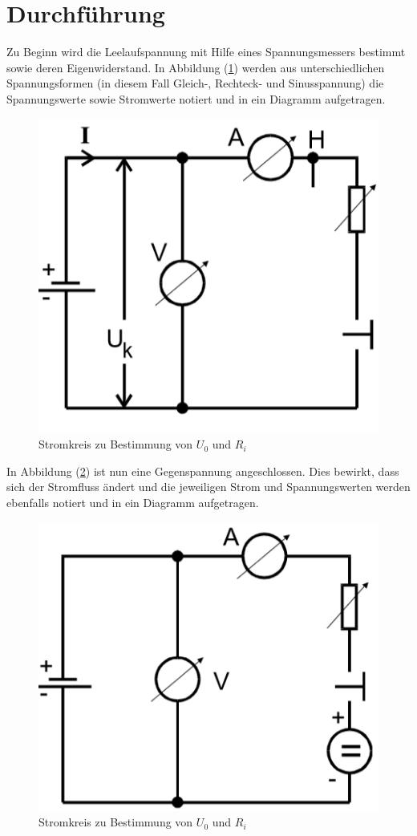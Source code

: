 \section{Durchführung}
Zu Beginn wird die Leelaufspannung mit Hilfe eines Spannungsmessers bestimmt sowie deren Eigenwiderstand.
In Abbildung (\ref{abb:2}) werden aus unterschiedlichen Spannungsformen (in diesem Fall Gleich-, Rechteck- und Sinusspannung)
die Spannungswerte sowie Stromwerte notiert und in ein Diagramm aufgetragen.
\begin{figure}[H]
  \centering
  \includegraphics[width= 10 cm , height=7 cm]{Bild2.png}
  \caption{Stromkreis zu Bestimmung von $U_0$ und $R_i$ \cite{1}}
  \label{abb:2}
\end{figure}
In Abbildung (\ref{abb:3}) ist nun eine Gegenspannung angeschlossen. Dies bewirkt, dass sich der Stromfluss
ändert und die jeweiligen Strom und Spannungswerten werden ebenfalls notiert und in ein Diagramm aufgetragen.
\begin{figure}[H]
  \centering
  \includegraphics[width=10 cm, height= 7 cm]{Bild3.png}
  \caption{Stromkreis zu Bestimmung von $U_0$ und $R_i$ \cite{1}}
  \label{abb:3}
\end{figure}
